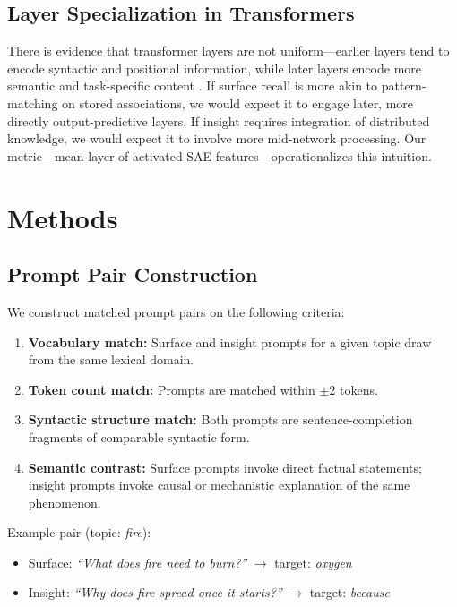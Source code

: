 \documentclass{article}
\begin{document}
\subsection{Layer Specialization in Transformers}

There is evidence that transformer layers are not uniform---earlier layers tend to encode 
syntactic and positional information, while later layers encode more semantic and task-specific 
content \citep{tenney2019, rogers2020}. If surface recall is more akin to pattern-matching on 
stored associations, we would expect it to engage later, more directly output-predictive layers. 
If insight requires integration of distributed knowledge, we would expect it to involve more 
mid-network processing. Our metric---mean layer of activated SAE features---operationalizes 
this intuition.

\section{Methods}

\subsection{Prompt Pair Construction}

We construct matched prompt pairs on the following criteria:
\begin{enumerate}
\item \textbf{Vocabulary match:} Surface and insight prompts for a given topic draw from the 
same lexical domain.
\item \textbf{Token count match:} Prompts are matched within $\pm$2 tokens.
\item \textbf{Syntactic structure match:} Both prompts are sentence-completion fragments of 
comparable syntactic form.
\item \textbf{Semantic contrast:} Surface prompts invoke direct factual statements; insight 
prompts invoke causal or mechanistic explanation of the same phenomenon.
\end{enumerate}

Example pair (topic: \textit{fire}):
\begin{itemize}
\item Surface: \textit{``What does fire need to burn?''} $\rightarrow$ target: \textit{oxygen}
\item Insight: \textit{``Why does fire spread once it starts?''} $\rightarrow$ target: \textit{because}
\end{itemize}
\end{document}
